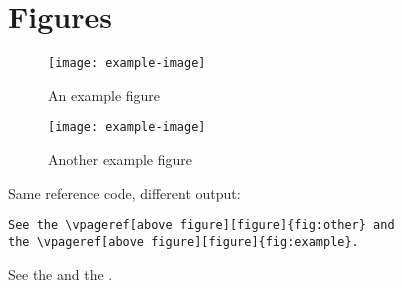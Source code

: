 \documentclass{article}
\begin{document}
\section{Figures}
\begin{figure}
\texttt{[image: example-image]}
\caption{An example figure}
\label{fig:example}
\end{figure}
\blindtext
\begin{figure}
\texttt{[image: example-image]}
\caption{Another example figure}
\label{fig:other}
\end{figure}
\newpage
Same reference code, different output:
\begin{verbatim}
See the \vpageref[above figure][figure]{fig:other} and
the \vpageref[above figure][figure]{fig:example}.
\end{verbatim}
See the  and
the .
\end{document}
